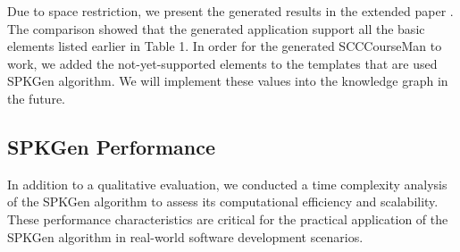 \documentclass[runningheads]{llncs}
\begin{document}

Due to space restriction, we present the generated results in the extended paper \cite{ext_paper}.
The comparison showed that the generated application support all the basic elements listed earlier in Table 1. In order for the generated SCCCourseMan to work, we added the not-yet-supported elements to the templates that are used SPKGen algorithm. We will implement these values into the knowledge graph in the future. 

\subsection{SPKGen Performance}

In addition to a qualitative evaluation, we conducted a time complexity analysis of the SPKGen algorithm to assess its computational efficiency and scalability. These performance characteristics are critical for the practical application of the SPKGen algorithm in real-world software development scenarios. 
\end{document}

